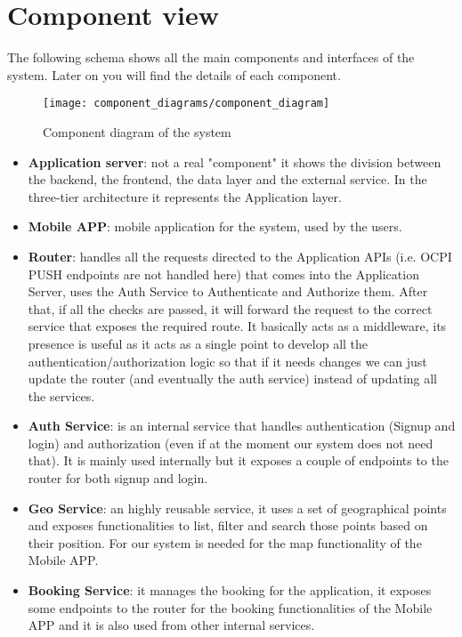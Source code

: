 \clearpage

\section{Component view}
The following schema shows all the main components and interfaces of the system. Later on you will find the details of each component.


\begin{figure}[h]
\centering
\texttt{[image: component\_diagrams/component\_diagram]}
\caption{Component diagram of the system}
\end{figure}

\clearpage
\newpage

\begin{itemize}
	\item \textbf{Application server}: not a real "component" it shows the division between the backend, the frontend, the data layer and the external service. In the three-tier architecture it represents the Application layer.
	\item \textbf{Mobile APP}: mobile application for the system, used by the users.
	\item \textbf{Router}: handles all the requests directed to the Application APIs (i.e. OCPI PUSH endpoints are not handled here) that comes into the Application Server, uses the Auth Service to Authenticate and Authorize them. After that, if all the checks are passed, it will forward the request to the correct service that exposes the required route. It basically acts as a middleware, its presence is useful as it acts as a single point to develop all the authentication/authorization logic so that if it needs changes we can just update the router (and eventually the auth service) instead of updating all the services.
	\item \textbf{Auth Service}: is an internal service that handles authentication (Signup and login) and authorization (even if at the moment our system does not need that). It is mainly used internally but it exposes a couple of endpoints to the router for both signup and login.
	\item \textbf{Geo Service}: an highly reusable service, it uses a set of geographical points and exposes functionalities to list, filter and search those points based on their position. For our system is needed for the map functionality of the Mobile APP.
	\item \textbf{Booking Service}: it manages the booking for the application, it exposes some endpoints to the router for the booking functionalities of the Mobile APP and it is also used from other internal services.

\end{itemize}

